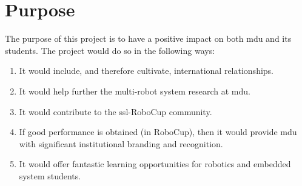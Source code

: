 \section{Purpose}
\label{section:purpose}

The purpose of this project is to have a positive impact on both \ac{mdu} and its students. The project would do so in the following ways:
\begin{enumerate}
    \item It would include, and therefore cultivate, international relationships. 
    \item It would help further the multi-robot system research at \ac{mdu}. 
    \item It would contribute to the \ac{ssl}-RoboCup community.
    \item If good performance is obtained (in RoboCup), then it would provide \ac{mdu} with significant institutional branding and recognition.
    \item It would offer fantastic learning opportunities for robotics and embedded system students.
\end{enumerate}

